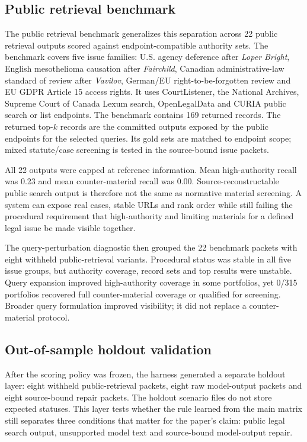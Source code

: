\documentclass[12pt,a4paper]{article}
\begin{document}
\subsection{Public retrieval benchmark}

The public retrieval benchmark generalizes this separation across 22 public retrieval outputs scored against endpoint-compatible authority sets. The benchmark covers five issue families: U.S. agency deference after \textit{Loper Bright}, English mesothelioma causation after \textit{Fairchild}, Canadian administrative-law standard of review after \textit{Vavilov}, German/EU right-to-be-forgotten review and EU GDPR Article 15 access rights. It uses CourtListener, the National Archives, Supreme Court of Canada Lexum search, OpenLegalData and CURIA public search or list endpoints. The benchmark contains 169 returned records. The returned top-$k$ records are the committed outputs exposed by the public endpoints for the selected queries. Its gold sets are matched to endpoint scope; mixed statute/case screening is tested in the source-bound issue packets.

All 22 outputs were capped at reference information. Mean high-authority recall was 0.23 and mean counter-material recall was 0.00. Source-reconstructable public search output is therefore not the same as normative material screening. A system can expose real cases, stable URLs and rank order while still failing the procedural requirement that high-authority and limiting materials for a defined legal issue be made visible together.

The query-perturbation diagnostic then grouped the 22 benchmark packets with eight withheld public-retrieval variants. Procedural status was stable in all five issue groups, but authority coverage, record sets and top results were unstable. Query expansion improved high-authority coverage in some portfolios, yet 0/315 portfolios recovered full counter-material coverage or qualified for screening. Broader query formulation improved visibility; it did not replace a counter-material protocol.

\subsection{Out-of-sample holdout validation}

After the scoring policy was frozen, the harness generated a separate holdout layer: eight withheld public-retrieval packets, eight raw model-output packets and eight source-bound repair packets. The holdout scenario files do not store expected statuses. This layer tests whether the rule learned from the main matrix still separates three conditions that matter for the paper's claim: public legal search output, unsupported model text and source-bound model-output repair.
\end{document}
